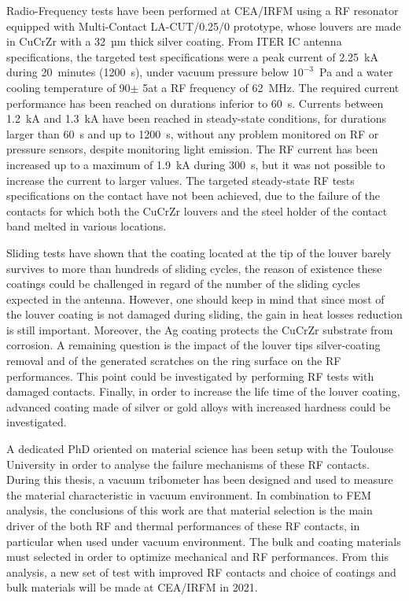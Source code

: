 {Radio-Frequency tests have been performed at CEA/IRFM using a RF resonator equipped with Multi-Contact LA-CUT/0.25/0 prototype, whose louvers are made in CuCrZr with a 32~µm thick silver coating. From ITER IC antenna specifications, the targeted test specifications were a peak current of 2.25~kA during 20~minutes (1200~s), under vacuum pressure below $10^{-3}$~Pa and a water cooling temperature of 90\degC $\pm$ 5\degC at a RF frequency of 62~MHz. The required current performance has been reached on durations inferior to 60~s. Currents between 1.2~kA and 1.3~kA have been reached in steady-state conditions, for durations larger than 60~s and up to 1200~s, without any problem monitored on RF or pressure sensors, despite monitoring light emission. The RF current has been increased up to a maximum of 1.9~kA during 300~s, but it was not possible to increase the current to larger values. The targeted steady-state RF tests specifications on the contact have not been achieved, due to the failure of the contacts for which both the CuCrZr louvers and the steel holder of the contact band melted in various locations. 

Sliding tests have shown that the coating located at the tip of the louver barely survives to more than hundreds of sliding cycles, the reason of existence these coatings could be challenged in regard of the number of the sliding cycles expected in the antenna. However, one should keep in mind that since most of the louver coating is not damaged during sliding, the gain in heat losses reduction is still important. Moreover, the Ag coating protects the CuCrZr substrate from corrosion. A remaining question is the impact of the louver tips silver-coating removal and of the generated scratches on the ring surface on the RF performances. This point could be investigated by performing RF tests with damaged contacts. Finally, in order to increase the life time of the louver coating, advanced coating made of silver or gold alloys with increased hardness could be investigated.

A dedicated PhD oriented on material science has been setup with the Toulouse University in order to analyse the failure mechanisms of these RF contacts. During this thesis, a vacuum tribometer has been designed and used to measure the material characteristic in vacuum environment. In combination to FEM analysis, the conclusions of this work are that material selection is the main driver of the both RF and thermal performances of these RF contacts, in particular when used under vacuum environment. The bulk and coating materials must selected in order to optimize mechanical and RF performances. From this analysis, a new set of test with improved RF contacts and choice of coatings and bulk materials will be made at CEA/IRFM in 2021.



}
